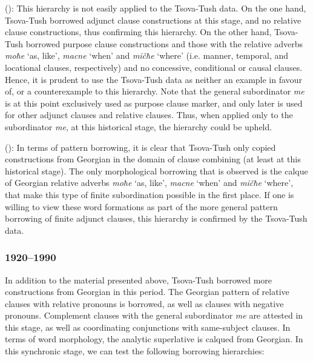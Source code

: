 \begin{description}[font=\normalfont]
	\item[\emph{Concessive, conditional, causal, purpose > other subordinators}] (\cite[220]{matras2011universals}): This hierarchy is not easily applied to the Tsova-Tush data. On the one hand, Tsova-Tush borrowed adjunct clause constructions at this stage, and no relative clause constructions, thus confirming this hierarchy. On the other hand, Tsova-Tush borrowed purpose clause constructions and those with the relative adverbs \textit{moħe} `as, like', \textit{macne} `when' and \textit{mičħe} `where' (i.e. manner, temporal, and locational clauses, respectively) and no concessive, conditional or causal clauses. Hence, it is prudent to use the Tsova-Tush data as neither an example in favour of, or a counterexample to this hierarchy. Note that the general subordinator \textit{me} is at this point exclusively used as purpose clause marker, and only later is used for other adjunct clauses and relative clauses. Thus, when applied only to the subordinator \textit{me}, at this historical stage, the hierarchy could be upheld.
	
	\item[\emph{Clause linking > word morphology}] (\cite[224]{matras2011universals}): In terms of pattern borrowing, it is clear that Tsova-Tush only copied constructions from Georgian in the domain of clause combining (at least at this historical stage). The only morphological borrowing that is observed is the calque of Georgian relative adverbs \textit{moħe} `as, like', \textit{macne} `when' and \textit{mičħe} `where', that make this type of finite subordination possible in the first place. If one is willing to view these word formations as part of the more general pattern borrowing of finite adjunct clauses, this hierarchy is confirmed by the Tsova-Tush data.
\end{description}

\subsubsection{1920--1990}

In addition to the material presented above, Tsova-Tush borrowed more constructions from Georgian in this period. The Georgian pattern of relative clauses with relative pronouns is borrowed, as well as clauses with negative pronouns. Complement clauses with the general subordinator \textit{me} are attested in this stage, as well as coordinating conjunctions with same-subject clauses. In terms of word morphology, the analytic superlative is calqued from Georgian. In this synchronic stage, we can test the following borrowing hierarchies:

